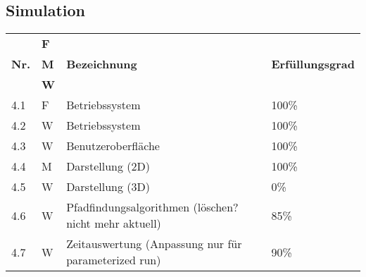 \documentclass[main.tex]{subfiles} %
\begin{document}
\subsection*{Simulation}

\begin{tabular}{|l|p{0.5cm}|p{4cm}|p{10cm}|}
  \hline
               & \textbf{F} &                                  &                                                                                                                                                                                                                                                                                                                                                                                 \\
  \textbf{Nr.} & \textbf{M} & \textbf{Bezeichnung}             & \textbf{Erfüllungsgrad}                                                                                                                                                                                                                                                                                                                                                                                \\
               & \textbf{W} &                                  &                                                                                                                                                                                                                                                                                                                                                                         \\
  \hline
  4.1          & F              & Betriebssystem               & 100\%                    \\
  4.2          & W              & Betriebssystem               & 100\%                    \\
  4.3          & W              & Benutzeroberfläche           & 100\%                    \\
  4.4          & M              & Darstellung (2D)             & 100\%                   \\
  4.5          & W              & Darstellung (3D)             & 0\%                    \\
  4.6          & W              & Pfadfindungsalgorithmen (löschen? nicht mehr aktuell)      & 85\%                    \\
  4.7          & W              & Zeitauswertung (Anpassung nur für parameterized run)               & 90\%                    \\

\end{tabular}
\end{document}

